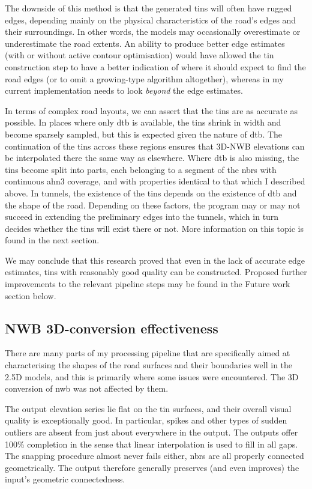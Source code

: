 The downside of this method is that the generated \ac{tin}s will often have rugged edges, depending mainly on the physical characteristics of the road's edges and their surroundings. In other words, the models may occasionally overestimate or underestimate the road extents. An ability to produce better edge estimates (with or without active contour optimisation) would have allowed the \ac{tin} construction step to have a better indication of where it should expect to find the road edges (or to omit a growing-type algorithm altogether), whereas in my current implementation needs to look \textit{beyond} the edge estimates.

In terms of complex road layouts, we can assert that the \ac{tin}s are as accurate as possible. In places where only \ac{dtb} is available, the \ac{tin}s shrink in width and become sparsely sampled, but this is expected given the nature of \ac{dtb}. The continuation of the \ac{tin}s across these regions ensures that 3D-NWB elevations can be interpolated there the same way as elsewhere. Where \ac{dtb} is also missing, the \ac{tin}s become split into parts, each belonging to a segment of the \ac{nbrs} with continuous \ac{ahn3} coverage, and with properties identical to that which I described above. In tunnels, the existence of the \ac{tin}s depends on the existence of \ac{dtb} and the shape of the road. Depending on these factors, the program may or may not succeed in extending the preliminary edges into the tunnels, which in turn decides whether the \ac{tin}s will exist there or not. More information on this topic is found in the next section.

We may conclude that this research proved that even in the lack of accurate edge estimates, \ac{tin}s with reasonably good quality can be constructed. Proposed further improvements to the relevant pipeline steps may be found in the Future work section below.

\subsection{NWB 3D-conversion effectiveness}
\label{sub:effectivenessconversion}

There are many parts of my processing pipeline that are specifically aimed at characterising the shapes of the road surfaces and their boundaries well in the 2.5D models, and this is primarily where some issues were encountered. The 3D conversion of \ac{nwb} was not affected by them.

The output elevation series lie flat on the \ac{tin} surfaces, and their overall visual quality is exceptionally good. In particular, spikes and other types of sudden outliers are absent from just about everywhere in the output. The outputs offer 100\% completion in the sense that linear interpolation is used to fill in all gaps. The snapping procedure almost never fails either, \ac{nbrs} are all properly connected geometrically. The output therefore generally preserves (and even improves) the input's geometric connectedness.

